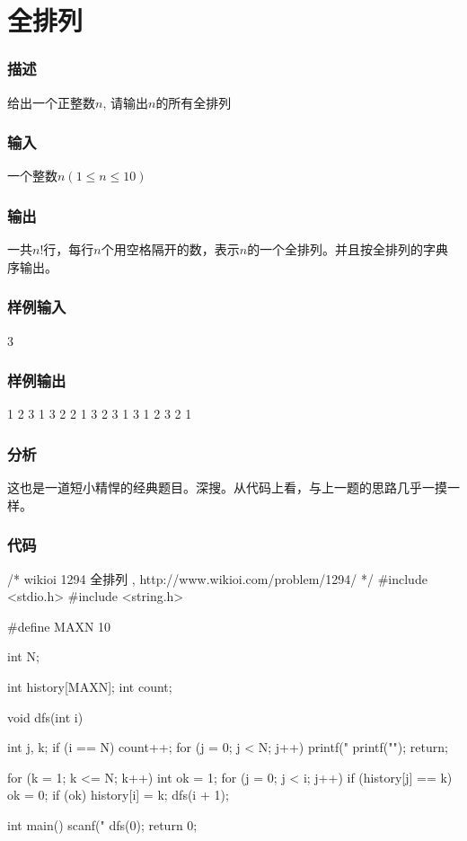 \section{全排列} %

\subsubsection{描述}
给出一个正整数$n$, 请输出$n$的所有全排列

\subsubsection{输入}
一个整数$n(1 \leq n \leq 10)$

\subsubsection{输出}
一共$n!$行，每行$n$个用空格隔开的数，表示$n$的一个全排列。并且按全排列的字典序输出。

\subsubsection{样例输入}
\begin{Code}
3
\end{Code}

\subsubsection{样例输出}
\begin{Code}
1 2 3
1 3 2
2 1 3
2 3 1
3 1 2
3 2 1
\end{Code}

\subsubsection{分析}
这也是一道短小精悍的经典题目。深搜。从代码上看，与上一题的思路几乎一摸一样。

\subsubsection{代码}
\begin{Codex}[label=all_permutations.c]
/* wikioi 1294 全排列   , http://www.wikioi.com/problem/1294/ */
#include <stdio.h>
#include <string.h>

#define MAXN 10

int N;

int history[MAXN];
int count;

void dfs(int i) {
    int j, k;
    if (i == N) {
        count++;
        for (j = 0; j < N; j++) {
            printf("%
        }
        printf("\n");
        return;
    }

    for (k = 1; k <= N; k++) {
        int ok = 1;
        for (j = 0; j < i; j++) {
            if (history[j] == k)
                ok = 0;
        }
        if (ok) {
            history[i] = k;
            dfs(i + 1);
        }
    }
}

int main() {
    scanf("%
    dfs(0);
    return 0;
}
\end{Codex}

